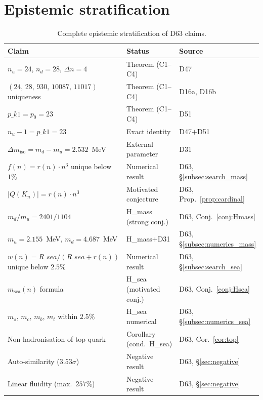 \documentclass[12pt,a4paper]{article}
\def\Rsea{R\_sea}
\def\pkone{p\_k1}
\def\QQ{Q}
\theoremstyle{plain}
\theoremstyle{definition}
\theoremstyle{remark}
\newcommand{\quintuplet}{(24,\,28,\,930,\,10087,\,11017)}
\newcommand{\nnu}{n_u}
\newcommand{\nnd}{n_d}
\newcommand{\Dn}{\Delta n}
\newcommand{\Rsea}{R_{\mathrm{sea}}}
\newcommand{\pkone}{p_{k_1}}
\newcommand{\Dmiso}{\Delta m_{\mathrm{iso}}}
\newcommand{\mup}{m_u}
\newcommand{\mdown}{m_d}
\newcommand{\mstrange}{m_s}
\newcommand{\mcharm}{m_c}
\newcommand{\mbottom}{m_b}
\newcommand{\mtop}{m_t}
\newcommand{\QQ}{\mathcal{Q}}
\begin{document}
\section{Epistemic stratification}
\label{sec:epistemic}

\begin{table}[H]
\centering
\caption{Complete epistemic stratification of D63 claims.}
\label{tab:epistemic}
\renewcommand{\arraystretch}{1.3}
\begin{tabular}{p{7.5cm} p{3.2cm} p{3.5cm}}
\toprule
\textbf{Claim} & \textbf{Status} & \textbf{Source} \\
\midrule
$\nnu = 24$, $\nnd = 28$, $\Dn = 4$ & Theorem (C1--C4) & D47~\cite{D47} \\
$\quintuplet$ uniqueness & Theorem (C1--C4) & D16a, D16b~\cite{D16a,D16b} \\
$\pkone = p_9 = 23$ & Theorem (C1--C4) & D51~\cite{D51} \\
$\nnu - 1 = \pkone = 23$ & Exact identity & D47$+$D51 \\
$\Dmiso = \mdown - \mup = 2.532$~MeV & External parameter & D31~\cite{D31} \\
$f(n) = r(n) \cdot n^3$ unique below $1\%$ & Numerical result & D63, \S\ref{subsec:search_mass} \\
$|\QQ(K_n)| = r(n) \cdot n^3$ & Motivated conjecture & D63, Prop.~\ref{prop:cardinal} \\
$\mdown/\mup = 2401/1104$ & H\_mass (strong conj.) & D63, Conj.~\ref{conj:Hmass} \\
$\mup = 2.155$~MeV, $\mdown = 4.687$~MeV & H\_mass$+$D31 & D63, \S\ref{subsec:numerics_mass} \\
$w(n) = \Rsea/(\Rsea+r(n))$ unique below $2.5\%$ & Numerical result & D63, \S\ref{subsec:search_sea} \\
$m_{\mathrm{sea}}(n)$ formula & H\_sea (motivated conj.) & D63, Conj.~\ref{conj:Hsea} \\
$\mstrange$, $\mcharm$, $\mbottom$, $\mtop$ within $2.5\%$ & H\_sea numerical & D63, \S\ref{subsec:numerics_sea} \\
Non-hadronisation of top quark & Corollary (cond.\ H\_sea) & D63, Cor.~\ref{cor:top} \\
Auto-similarity ($3.53\sigma$) & Negative result & D63, \S\ref{sec:negative} \\
Linear fluidity (max.\ $257\%$) & Negative result & D63, \S\ref{sec:negative} \\

\end{tabular}
\end{table}
\end{document}
